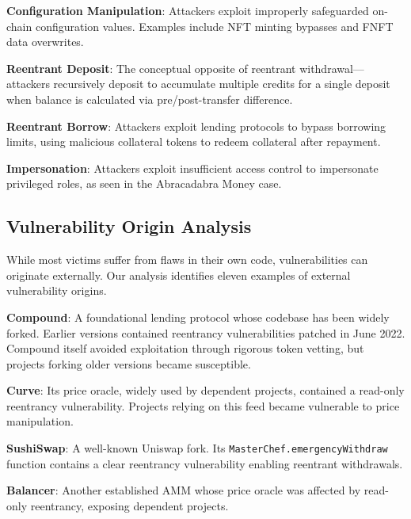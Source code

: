 \textbf{Configuration Manipulation}: Attackers exploit improperly safeguarded on-chain configuration values. Examples include NFT minting bypasses and FNFT data overwrites.

\textbf{Reentrant Deposit}: The conceptual opposite of reentrant withdrawal---attackers recursively deposit to accumulate multiple credits for a single deposit when balance is calculated via pre/post-transfer difference.

\textbf{Reentrant Borrow}: Attackers exploit lending protocols to bypass borrowing limits, using malicious collateral tokens to redeem collateral after repayment.

\textbf{Impersonation}: Attackers exploit insufficient access control to impersonate privileged roles, as seen in the Abracadabra Money case.


\subsection{Vulnerability Origin Analysis}
\label{sec:results-origin}

While most victims suffer from flaws in their own code, vulnerabilities can originate externally. Our analysis identifies eleven examples of external vulnerability origins.


\textbf{Compound}: A foundational lending protocol whose codebase has been widely forked. Earlier versions contained reentrancy vulnerabilities patched in June 2022. Compound itself avoided exploitation through rigorous token vetting, but projects forking older versions became susceptible.

\textbf{Curve}: Its price oracle, widely used by dependent projects, contained a read-only reentrancy vulnerability. Projects relying on this feed became vulnerable to price manipulation.

\textbf{SushiSwap}: A well-known Uniswap fork. Its \lstinline{MasterChef.emergencyWithdraw} function contains a clear reentrancy vulnerability enabling reentrant withdrawals.

\textbf{Balancer}: Another established AMM whose price oracle was affected by read-only reentrancy, exposing dependent projects.

